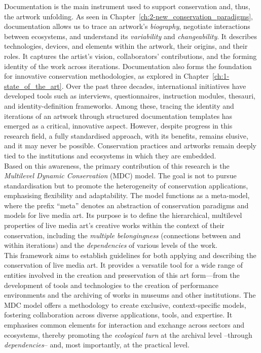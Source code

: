 Documentation is the main instrument used to support conservation and, thus, the artwork unfolding. As seen in Chapter~\ref{ch:2-new_conservation_paradigms}, documentation allows us to trace an artwork’s \textit{biography}, negotiate interactions between ecosystems, and understand its \textit{variability} and \textit{changeability}. It describes technologies, devices, and elements within the artwork, their origins, and their roles. It captures the artist’s vision, collaborators’ contributions, and the forming identity of the work across iterations. Documentation also forms the foundation for innovative conservation methodologies, as explored in Chapter~\ref{ch:1-state_of_the_art}. Over the past three decades, international initiatives have developed tools such as interviews, questionnaires, instruction modules, thesauri, and identity-definition frameworks. Among these, tracing the identity and iterations of an artwork through structured documentation templates has emerged as a critical, innovative aspect. However, despite progress in this research field, a fully standardised approach, with its benefits, remains elusive, and it may never be possible. Conservation practices and artworks remain deeply tied to the institutions and ecosystems in which they are embedded.\\
Based on this awareness, the primary contribution of this research is the \textit{Multilevel Dynamic Conservation} (MDC) model. The goal is not to pursue standardisation but to promote the heterogeneity of conservation applications, emphasising flexibility and adaptability. The model functions as a meta-model, where the prefix ``meta'' denotes an abstraction of conservation paradigms and models for live media art. Its purpose is to define the hierarchical, multilevel properties of live media art’s creative works within the context of their conservation, including the \textit{multiple belongingness} (connections between and within iterations) and the \textit{dependencies} of various levels of the work. \\
This framework aims to establish guidelines for both applying and describing the conservation of live media art. It provides a versatile tool for a wide range of entities involved in the creation and preservation of this art form—from the development of tools and technologies to the creation of performance environments and the archiving of works in museums and other institutions. The MDC model offers a methodology to create exclusive, context-specific models, fostering collaboration across diverse applications, tools, and expertise. It emphasises common elements for interaction and exchange across sectors and ecosystems, thereby promoting the \textit{ecological turn} at the archival level –through \textit{dependencies}– and, most importantly, at the practical level.\\
